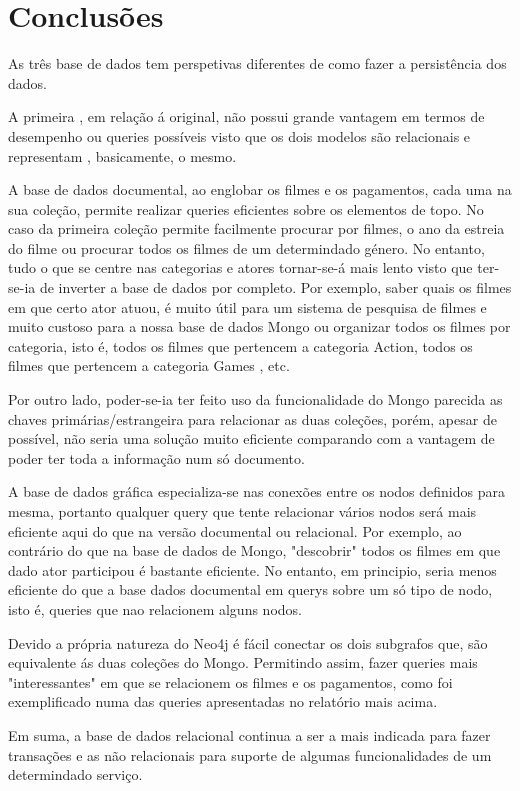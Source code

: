 \section{Conclusões}

\par As três base de dados tem perspetivas diferentes de como fazer a persistência dos dados. 

\par A primeira , em relação á original, não possui grande vantagem em termos de desempenho ou queries possíveis visto que os dois modelos são relacionais e representam , basicamente, o mesmo.\newline

\par A base de dados documental, ao englobar os filmes e os pagamentos, cada uma na sua coleção, permite realizar queries eficientes sobre os elementos de topo. No caso da primeira coleção permite facilmente procurar por filmes, o ano da estreia do filme ou procurar todos os filmes de um determindado género. No entanto, tudo o que se centre nas categorias e atores tornar-se-á mais lento visto que ter-se-ia de inverter a base de dados por completo. Por exemplo, saber quais os filmes em que certo ator atuou, é muito útil para um sistema de pesquisa de filmes e muito custoso para a nossa base de dados Mongo ou organizar todos os filmes por categoria, isto é, todos os filmes que pertencem a categoria Action, todos os filmes que pertencem a categoria Games , etc.\newline

\par Por outro lado, poder-se-ia ter feito uso da funcionalidade do Mongo parecida as chaves primárias/estrangeira para relacionar as duas coleções, porém, apesar de possível, não seria uma solução muito eficiente comparando com a vantagem de poder ter toda a informação num só documento.\newline

A base de dados gráfica especializa-se nas conexões entre os nodos definidos para mesma, portanto qualquer query que tente relacionar vários nodos será mais eficiente aqui do que na versão documental ou relacional. Por exemplo, ao contrário do que na base de dados de Mongo, "descobrir" todos os filmes em que dado ator participou é bastante eficiente. No entanto, em principio, seria menos eficiente do que a base dados documental em querys sobre um só tipo de nodo, isto é, queries que nao relacionem alguns nodos.\newline

Devido a própria natureza do Neo4j é fácil conectar os dois subgrafos que, são equivalente ás duas coleções do Mongo. Permitindo assim, fazer queries mais "interessantes" em que se relacionem os filmes e os pagamentos, como foi exemplificado numa das queries apresentadas no relatório mais acima.\newline

Em suma, a base de dados relacional continua a ser a mais indicada para fazer transações e as não relacionais para suporte de algumas funcionalidades de um determindado serviço.\newline
